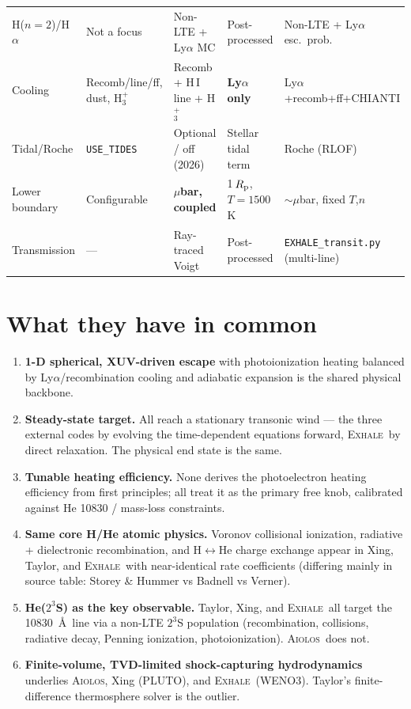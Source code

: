 \documentclass[11pt]{article}
\newcommand{\Rp}{R_{\rm p}}
\newcommand{\EXHALE}{\textsc{Exhale}}
\newcommand{\AIOLOS}{\textsc{Aiolos}}
\begin{document}
\begin{longtable}{p{2.3cm} p{2.7cm} p{2.9cm} p{2.7cm} p{2.9cm}}
H($n{=}2$)/H$\alpha$ & Not a focus & Non-LTE + Ly$\alpha$ MC & Post-processed & Non-LTE + Ly$\alpha$ esc.\ prob. \\
Cooling & Recomb/line/ff, dust, H$_3^+$ & Recomb + H\,I line + H$_3^+$ & \textbf{Ly$\alpha$ only} & Ly$\alpha$+recomb+ff+CHIANTI \\
Tidal/Roche & \texttt{USE\_TIDES} & Optional / off (2026) & Stellar tidal term & Roche (RLOF) \\
Lower boundary & Configurable & \textbf{$\mu$bar, coupled} & 1\,$\Rp$, $T{=}1500$\,K & $\sim\mu$bar, fixed $T$,$n$ \\
Transmission & --- & Ray-traced Voigt & Post-processed & \texttt{EXHALE\_transit.py} (multi-line) \\
\bottomrule
\end{longtable}
\normalsize

\section{What they have in common}

\begin{enumerate}[nosep]
  \item \textbf{1-D spherical, XUV-driven escape} with photoionization heating balanced by
    Ly$\alpha$/recombination cooling and adiabatic expansion is the shared physical backbone.
  \item \textbf{Steady-state target.} All reach a stationary transonic wind --- the three
    external codes by evolving the time-dependent equations forward, \EXHALE\ by direct
    relaxation. The physical end state is the same.
  \item \textbf{Tunable heating efficiency.} None derives the photoelectron heating
    efficiency from first principles; all treat it as the primary free knob, calibrated
    against He 10830 / mass-loss constraints.
  \item \textbf{Same core H/He atomic physics.} Voronov collisional ionization, radiative +
    dielectronic recombination, and H$\leftrightarrow$He charge exchange appear in Xing,
    Taylor, and \EXHALE\ with near-identical rate coefficients (differing mainly in source
    table: Storey \& Hummer vs Badnell vs Verner).
  \item \textbf{He($2^3$S) as the key observable.} Taylor, Xing, and \EXHALE\ all target the
    10830~\AA\ line via a non-LTE $2^3$S population (recombination, collisions, radiative
    decay, Penning ionization, photoionization). \AIOLOS\ does not.
  \item \textbf{Finite-volume, TVD-limited shock-capturing hydrodynamics} underlies \AIOLOS,
    Xing (PLUTO), and \EXHALE\ (WENO3). Taylor's finite-difference thermosphere solver is the
    outlier.
\end{enumerate}
\end{document}
